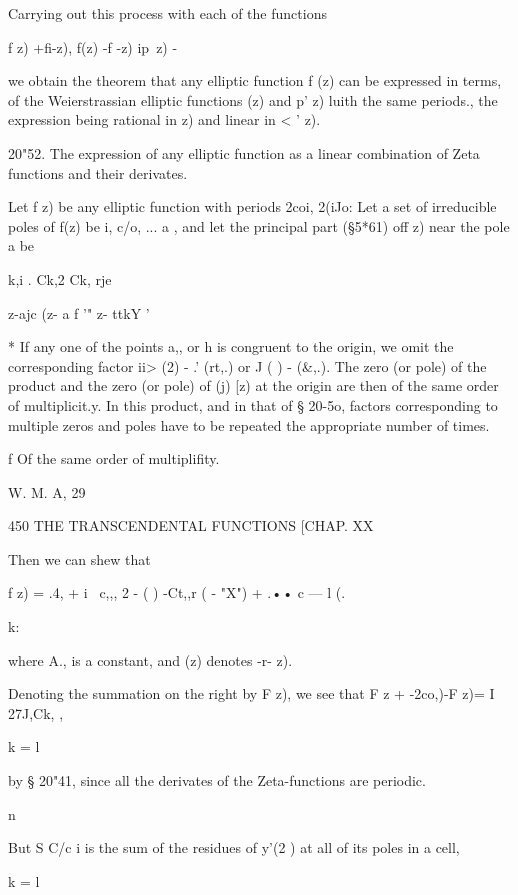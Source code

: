 {Carrying out this process with each of the functions 

f z) +fi-z),  f(z) -f -z)   ip\ z) -\ 

we obtain the theorem that any elliptic function f (z) can be expressed in terms, 
of the Weierstrassian elliptic functions   (z) and p'  z) luith the same periods., 
the expression being rational in    z) and linear in < '  z). 

20"52. The expression of any elliptic function as a linear combination of 
Zeta functions and their derivates. 

Let f z) be any elliptic function with periods 2coi, 2(iJo: Let a set of 
irreducible poles of f(z) be  i, c/o, ... a , and let the principal part (§5*61) 
off z) near the pole a  be 

 k,i . Ck,2 Ck, rje 



z-ajc (z- a f '"  z- ttkY  ' 

* If any one of the points a,, or h  is congruent to the origin, we omit the corresponding  
factor  ii> (2) -  .' (rt,.) or  J ( ) -   (\&,.). The zero (or pole) of the product and the zero (or pole) 
of (j) [z) at the origin are then of the same order of multiplicit.y. In this product, and in that of 
§ 20-5o, factors corresponding to multiple zeros and poles have to be repeated the appropriate 
number of times. 

f Of the same order of multiplifity. 

W. M. A, 29 



450 THE TRANSCENDENTAL FUNCTIONS [CHAP. XX 

Then we can shew that 

f z) = .4, + i \ c,,,  2 - ( ) -Ct,,r (  - "X") + .•• 
c — l (. 



k: 



where A., is a constant, and    (z) denotes -r-   z). 

Denoting the summation on the right by F z), we see that 
F z + -2co,)-F z)= I  27J,Ck, , 

k = l 

by § 20"41, since all the derivates of the Zeta-functions are periodic. 

n 

But S C/c i is the sum of the residues of y'(2 ) at all of its poles in a cell, 

k = l 

}
